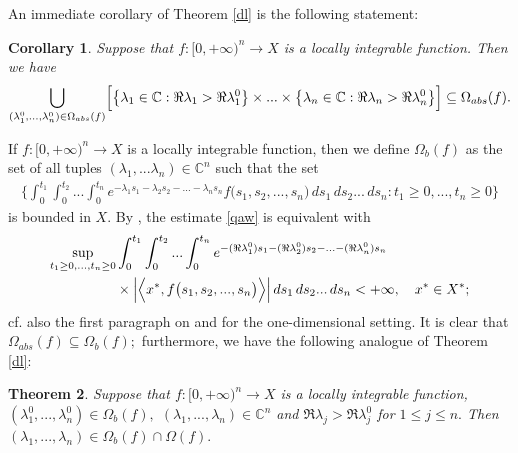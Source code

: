 \documentclass{amsart}
\newtheorem{thm}{Theorem}[section]
\newtheorem{cor}[thm]{Corollary}
\theoremstyle{definition}
\theoremstyle{remark}
\numberwithin{equation}{section}
\begin{document}
An immediate corollary of Theorem \ref{dl} is the following statement:

\begin{cor}\label{dl1}
Suppose that $f: [0,+\infty)^{n}\rightarrow X$ is a locally integrable function. Then we have
\begin{align*}
\bigcup_{(\lambda_{1}^{0},...,\lambda_{n}^{0})\in \Omega_{abs}(f)}\Bigl[ \bigl\{ \lambda_{1}\in {\mathbb C} : \Re \lambda_{1}>\Re \lambda_{1}^{0}\bigr\} \times ... \times \bigl\{ \lambda_{n}\in {\mathbb C} : \Re \lambda_{n}>\Re \lambda_{n}^{0}\bigr\}\Bigr] \subseteq \Omega_{abs}(f).
\end{align*}
\end{cor}  

If $f: [0,+\infty)^{n}\rightarrow X$ is a locally integrable function, then we define $\Omega_{b}(f)$ as the set of all tuples $(\lambda_{1},...\lambda_{n})\in {\mathbb C}^{n}$ such that the set
\begin{align}\label{qaw}
\Biggl\{
\int^{t_{1}}_{0}\int^{t_{2}}_{0}...\int^{t_{n}}_{0}e^{-\lambda_{1}s_{1}-\lambda_{2}s_{2}-...-\lambda_{n}s_{n}}f\bigl( s_{1},s_{2},...,s_{n}\bigr)\, ds_{1} \, ds_{2}...\, ds_{n} :  t_{1}\geq 0,...,t_{n}\geq 0\Biggr\}
\end{align}
is bounded in $X.$ By
 \cite[Mackey's theorem 23.15]{meise}, the estimate \eqref{qaw} is equivalent with 
\begin{align*} \sup_{t_{1}\geq 0,...,t_{n}\geq 0}&
\int^{t_{1}}_{0}\int^{t_{2}}_{0}...\int^{t_{n}}_{0}e^{-(\Re \lambda_{1}^{0})s_{1}-(\Re \lambda_{2}^{0})s_{2}-...-(\Re \lambda_{n}^{0})s_{n}}
\\& \times \Bigl| \Bigl \langle x^{\ast},f\bigl( s_{1},s_{2},...,s_{n}\bigr)\Bigr \rangle \Bigr|\, ds_{1} \, ds_{2}...\, ds_{n}<+\infty ,\quad x^{\ast}\in X^{\ast};
\end{align*}
cf. also the first paragraph on \cite[p. 29]{a43} and \cite[Theorem 1.4.1(ii)]{FKP} for the one-dimensional setting. It is clear that $\Omega_{abs}(f)\subseteq \Omega_{b}(f);$ furthermore, we have the following analogue of Theorem \ref{dl}:

\begin{thm}\label{djura}
Suppose that $f: [0,+\infty)^{n}\rightarrow X$ is a locally integrable function, $(\lambda_{1}^{0},...,\lambda_{n}^{0})\in \Omega_{b}(f),$  $(\lambda_{1},...,\lambda_{n})\in {\mathbb C}^{n}$ and $\Re \lambda_{j} >\Re \lambda_{j}^{0}$ for $1\leq j\leq n.$ Then $(\lambda_{1},...,\lambda_{n})\in \Omega_{b}(f) \cap \Omega(f).$
\end{thm}
\end{document}
